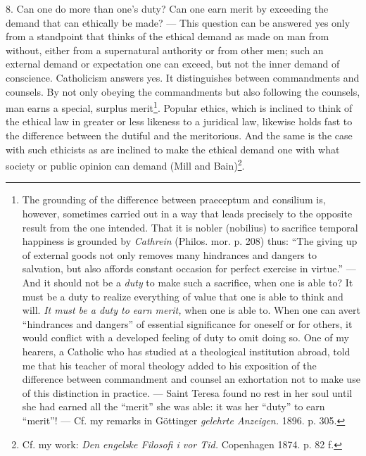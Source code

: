 \documentclass[12pt,a4paper,openany]{book}
\newcommand{\opage}[1]{\marginnote{\footnotesize\textit{[#1]}}}
\begin{document}
8. Can one do more than one's duty? Can one earn merit by exceeding the demand that can ethically be
made? --- This question can be answered yes only from a standpoint that thinks of the ethical demand as
made on man from without, either from a supernatural authority or from other men; such an external demand
or expectation one can exceed, but not the inner demand of conscience. Catholicism answers yes. It
distinguishes between commandments and counsels. By not only obeying the commandments but also following
the counsels,
\opage{105}man earns a special, surplus merit\footnote[1]{The grounding of the difference between praeceptum and
consilium is, however, sometimes carried out in a way that leads precisely to the opposite result from
the one intended. That it is nobler (nobilius) to sacrifice temporal happiness is grounded by
\emph{Cathrein} (Philos. mor. p. 208) thus: ``The giving up of external goods not only removes many
hindrances and dangers to salvation, but also affords constant occasion for perfect exercise in
virtue.'' --- And it should not be a \textit{duty} to make such a sacrifice, when one is able to? It must
be a duty to realize everything of value that one is able to think and will. \textit{It must be a duty to
earn merit,} when one is able to. When one can avert ``hindrances and dangers'' of essential
significance for oneself or for others, it would conflict with a developed feeling of duty to omit doing
so. One of my hearers, a Catholic who has studied at a theological institution abroad, told me that his
teacher of moral theology added to his exposition of the difference between commandment and counsel an
exhortation not to make use of this distinction in practice. --- Saint Teresa found no rest in her soul
until she had earned all the ``merit'' she was able: it was her ``duty'' to earn ``merit''! --- Cf. my remarks in
Göttinger \textit{gelehrte Anzeigen.} 1896. p. 305.}. Popular ethics, which is inclined to think of the
ethical law in greater or less likeness to a juridical law, likewise holds fast to the difference between
the dutiful and the meritorious. And the same is the case with such ethicists as are inclined to make the
ethical demand one with what society or public opinion can demand (Mill and Bain)\footnote[2]{Cf. my work:
\textit{Den engelske Filosofi i vor Tid.} Copenhagen 1874. p. 82 f.}.
\end{document}
